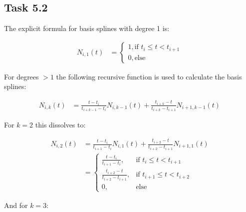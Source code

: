 \subsection*{Task 5.2}

The explicit formula for basis splines with degree 1 is:

\begin{align*}
	N_{i,1}(t) &= 
	\begin{cases}
	1, \text{if } t_i \le t < t_{i+1} \\
	0, \text{else} 
	\end{cases}
\end{align*}

For degrees $> 1$ the following recursive function is used to calculate the basis splines:

\begin{align*}
	N_{i,k}(t) &= \frac{t-t_i}{t_{i+k-1}-t_i}N_{i,k-1}(t)+\frac{t_{i+k}-t}{t_{i+k}-t_{i+1}}N_{i+1,k-1}(t)
\end{align*}

For $k=2$ this dissolves to:

\begin{align*}
N_{i,2}(t) &= \frac{t-t_i}{t_{i+1}-t_i}N_{i,1}(t)+\frac{t_{i+2}-t}{t_{i+2}-t_{i+1}}N_{i+1,1}(t)\\
&= 
\begin{cases}
\frac{t-t_i}{t_{i+1}-t_i}, & \text{if } t_i \le t < t_{i+1} \\
\frac{t_{i+2}-t}{t_{i+2}-t_{i+1}}, & \text{if } t_{i+1} \le t < t_{i+2}\\
0, & \text{else} 
\end{cases}
\end{align*}

And for $k=3$:

